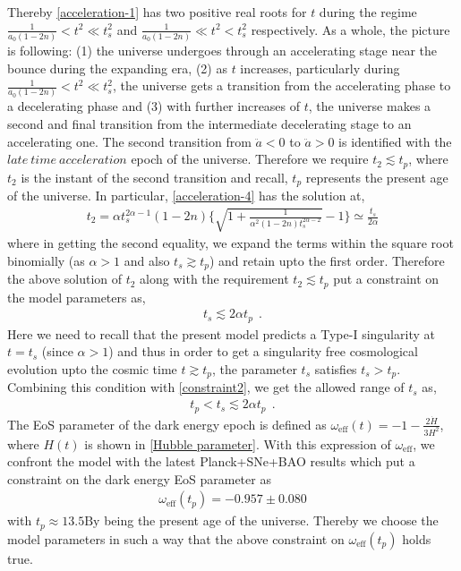 \documentclass{article}
\begin{document}
Thereby \ref{acceleration-1} has two positive real roots for $t$ during the regime $\frac{1}{a_0\left(1 - 2n\right)} < t^2 \ll t_s^2$ and 
$\frac{1}{a_0\left(1 - 2n\right)} \ll t^2 < t_s^2$ respectively. 
As a whole, the picture is following: (1) the universe undergoes through an accelerating stage near the bounce during the expanding era, (2) 
as $t$ increases, particularly during $\frac{1}{a_0\left(1 - 2n\right)} < t^2 \ll t_s^2$, the universe gets a transition from the accelerating phase to a 
decelerating phase and (3) with further increases of $t$, the universe makes a second and final 
transition from the intermediate decelerating stage to an accelerating one.  The second transition from $\ddot{a} < 0$ to $\ddot{a} > 0$ 
is identified with the $late~time~acceleration$ epoch of the universe. Therefore we require $t_2 \lesssim t_p$, where $t_2$ is the instant 
of the second transition and recall, $t_p$ represents the present age of the universe. In particular, \ref{acceleration-4} has the solution at,
\begin{eqnarray}
 t_2 = \alpha t_s^{2\alpha - 1}\left(1 - 2n\right)\bigg\{\sqrt{1 + \frac{1}{\alpha^2\left(1 - 2n\right)t_s^{2\alpha - 2}}} - 1\bigg\} \simeq \frac{t_s}{2\alpha}
 \label{acceleration-solution}
\end{eqnarray}
where in getting the second equality, we expand the terms within the square root binomially (as $\alpha > 1$ and also $t_s \gtrsim t_p$) 
and retain upto the first order. Therefore the above solution of $t_2$ along with the requirement $t_2 \lesssim t_p$ put a constraint 
on the model parameters as,
\begin{eqnarray}
 t_s \lesssim 2\alpha t_p~~.
 \label{constraint2}
\end{eqnarray}
Here we need to recall that the present model predicts a Type-I singularity at $t = t_s$ (since $\alpha > 1$) 
and thus in order to get a singularity free cosmological evolution upto the cosmic time $t \gtrsim t_p$, the parameter $t_s$ satisfies $t_s > t_p$. 
Combining this condition with \ref{constraint2}, we get the allowed range of $t_s$ as,
\begin{eqnarray}
 t_p < t_s \lesssim 2\alpha t_p~~.
 \label{constraint3}
\end{eqnarray}
The EoS parameter of the dark energy epoch is defined as $\omega_\mathrm{eff}(t) = -1-\frac{2\dot{H}}{3H^2}$, where $H(t)$ is shown 
in \ref{Hubble parameter}. With this expression of $\omega_\mathrm{eff}$, we confront the model with the latest Planck+SNe+BAO results which put 
a constraint on the dark energy EoS parameter as \cite{Aghanim:2018eyx}
\begin{eqnarray}
 \omega_\mathrm{eff}(t_p) = -0.957 \pm 0.080
 \label{Planck1}
\end{eqnarray}
with $t_p \approx 13.5\mathrm{By}$ being the present age of the universe. Thereby we choose the model parameters in such a way that the above constraint 
on $\omega_\mathrm{eff}(t_p)$ holds true.\\
\end{document}
